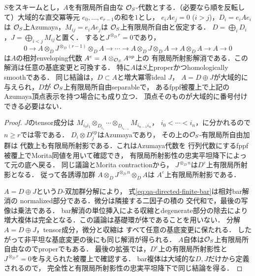 \begin{lemma}[Azumaya頂点を持つ有向代数の有限対角解消]
\label{lem:qa-directed-azumaya-bar}
$S$をスキームとし，$A$を有限局所自由な
$\mathcal O_S$-代数とする．（必要なら順を反転して）大域的な直交冪等元
$e_0,\ldots,e_{r-1}$の和を$1$とし，
$e_iAe_j=0$ ($i>j$)，$D_i=e_iAe_i$は
$\mathcal O_S$上Azumaya，$M_{ij}=e_iAe_j$は
$\mathcal O_S$上有限局所自由と仮定する．
$D=\bigoplus_iD_i$，$J=\bigoplus_{i<j}M_{ij}$と置く．
すると$J^{\otimes_Dr}=0$であり，
\begin{equation}
0\longrightarrow A\otimes_DJ^{\otimes_D(r-1)}\otimes_DA
\longrightarrow\cdots\longrightarrow
A\otimes_DJ\otimes_DA
\longrightarrow A\otimes_DA\longrightarrow A\longrightarrow0
\label{eq:qa-directed-finite-bar}
\end{equation}
は$A$の相対enveloping代数
$A^e=A\otimes_{\mathcal O_S}A^{\mathrm{op}}$上の
有限局所射影解消である．この解消は任意の基底変更と可換する．
特に$A$は$S$上properかつhomologically smoothである．
同じ結論は，$D\subset A$と増大冪零ideal $J$，
$A=D\oplus J$が大域的に与えられ，$D$が
$\mathcal O_S$上有限局所自由separableで，
あるfppf被覆上で上記のAzumaya頂点表示を持つ場合にも成り立つ．
頂点そのものが大域的に番号付けできる必要はない．
\end{lemma}
\begin{proof}
$J$のtensor成分は
$M_{i_0i_1}\otimes_{D_{i_1}}\cdots
\otimes_{D_{i_{n-1}}}M_{i_{n-1}i_n}$，
$i_0<\cdots<i_n$，に分かれるので$n\ge r$では零である．
$D_i\otimes D_j^{\mathrm{op}}$はAzumayaであり，
その上の$\mathcal O_S$-有限局所自由加群は
代数上も有限局所射影である．これはAzumaya代数を
行列代数にするfppf被覆上でMorita同値を用いて確認でき，
有限局所射影性の忠実平坦降下によって元の底へ戻る．
同じ議論とMorita contractionから，
$J^{\otimes_Dn}$は$D^e$上有限局所射影となる．
従って各誘導加群
$A\otimes_DJ^{\otimes_Dn}\otimes_DA$は
$A^e$上有限局所射影である．

$A=D\oplus J$という$D$-双加群分解により，
式\eqref{eq:qa-directed-finite-bar}は相対bar解消の
normalized部分である．微分は隣接する二因子の積の
交代和で，最後の写像は乗法である．
bar解消の単位挿入による収縮とdegenerate部分の除去により
増大複体は完全となる．この議論は基礎環が体であることを用いない．
分解$A=D\oplus J$，tensor成分，微分と収縮は
すべて任意の基底変更に保たれる．
したがって非平坦な基底変更の後にも同じ解消が得られる．
$A$自体は$\mathcal O_S$上有限局所自由なのでproperでもある．
最後の拡張では，$D^e$上の有限局所射影性と
$J^{\otimes_Dr}=0$を与えられた被覆上で確認する．
bar複体は大域的な$D,J$だけから定義されるので，
完全性と有限局所射影性の忠実平坦降下で同じ結論を得る．
\end{proof}


